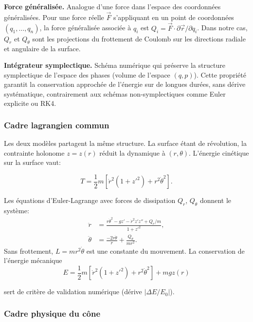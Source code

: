 \documentclass[
	a4paper, %
	10pt, %
	unnumberedsections, %
	twoside, %
]{LTJournalArticle}
\begin{document}
\textbf{Force généralisée.} Analogue d'une force dans l'espace des
coordonnées généralisées. Pour une force réelle $\vec{F}$ s'appliquant en
un point de coordonnées $(q_1,\ldots,q_n)$, la force généralisée associée
à $q_i$ est $Q_i = \vec{F}\cdot\partial\vec{r}/\partial q_i$. Dans notre
cas, $Q_r$ et $Q_\theta$ sont les projections du frottement de Coulomb sur
les directions radiale et angulaire de la surface.

\textbf{Intégrateur symplectique.} Schéma numérique qui préserve la
structure symplectique de l'espace des phases (volume de l'espace
$(q, p)$). Cette propriété garantit la conservation approchée de l'énergie
sur de longues durées, sans dérive systématique, contrairement aux schémas
non-symplectiques comme Euler explicite ou RK4.

\subsubsection{Cadre lagrangien commun}

Les deux modèles partagent la même structure. La surface étant de révolution,
la contrainte holonome $z=z(r)$ réduit la dynamique à $(r,\theta)$.
L'énergie cinétique sur la surface vaut:

\begin{equation}
    T = \frac{1}{2}m\!\left[\dot{r}^2(1+z'^2)+r^2\dot{\theta}^2\right].
\end{equation}

Les équations d'Euler-Lagrange avec forces de dissipation $Q_r$, $Q_\theta$
donnent le système:
\begin{align}
    \ddot{r}      &= \frac{r\dot{\theta}^2 - gz' - \dot{r}^2 z'z'' + Q_r/m}{1+z'^2}, \label{eq:rddot}\\
    \ddot{\theta} &= \frac{-2\dot{r}\dot{\theta}}{r} + \frac{Q_\theta}{mr^2}. \label{eq:thddot}
\end{align}
Sans frottement, $L=mr^2\dot{\theta}$ est une constante du mouvement.
La conservation de l'énergie mécanique
\begin{equation}
    E = \frac{1}{2}m\!\left[\dot{r}^2(1+z'^2)+r^2\dot{\theta}^2\right]+mgz(r)
\end{equation}

sert de critère de validation numérique (dérive $|\Delta E/E_0|$).

\subsubsection{Cadre physique du cône}
\label{app:cone-phys}
\end{document}
